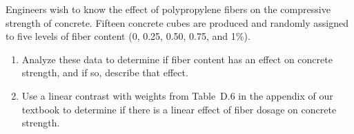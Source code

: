 \documentclass[10pt,twoside]{article}\usepackage[]{graphicx}\usepackage[dvipsnames,svgnames,table]{xcolor}
\begin{document}
\begin{enumerate}
  Engineers wish to know the effect of polypropylene fibers on the compressive strength of concrete. Fifteen concrete cubes are produced and randomly assigned to five levels of fiber content (0, 0.25, 0.50, 0.75, and 1\%).
  
  \begin{enumerate}
    \item Analyze these data to determine if fiber content has an effect on concrete strength, and if so, describe that effect.
    \item Use a linear contrast with weights from Table~D.6 in the appendix of our textbook to determine if there is a linear effect of fiber dosage on concrete strength.
  \end{enumerate}

  
  
\end{enumerate}
\end{document}
